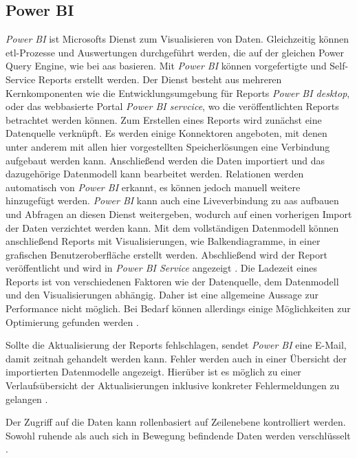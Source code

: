 \subsection{Power BI} \label{sec:grundlagen:azure_dienste:powerBI}
\textit{Power BI} ist Microsofts Dienst zum Visualisieren von Daten. Gleichzeitig können \ac{etl}-Prozesse und Auswertungen durchgeführt werden, die auf der gleichen Power Query Engine, wie bei \ac{aas} basieren. Mit \textit{Power BI} können vorgefertigte und Self-Service Reports erstellt werden. Der Dienst besteht aus mehreren Kernkomponenten wie die Entwicklungsumgebung für Reports \textit{Power BI desktop}, oder das webbasierte Portal \textit{Power BI servcice}, wo die veröffentlichten Reports betrachtet werden können. Zum Erstellen eines Reports wird zunächst eine Datenquelle verknüpft. Es werden einige Konnektoren angeboten, mit denen unter anderem mit allen hier vorgestellten Speicherlösungen eine Verbindung aufgebaut werden kann. Anschließend werden die Daten importiert und das dazugehörige Datenmodell kann bearbeitet werden. Relationen werden automatisch von \textit{Power BI} erkannt, es können jedoch manuell weitere hinzugefügt werden. \textit{Power BI} kann auch eine Liveverbindung zu \ac{aas} aufbauen und Abfragen an diesen Dienst weitergeben, wodurch auf einen vorherigen Import der Daten verzichtet werden kann. Mit dem vollständigen Datenmodell können anschließend Reports mit Visualisierungen, wie Balkendiagramme, in einer grafischen Benutzeroberfläche erstellt werden. Abschließend wird der Report veröffentlicht und wird in \textit{Power BI Service} angezeigt \cite{how_beyond_2020}. Die Ladezeit eines Reports ist von verschiedenen Faktoren wie der Datenquelle, dem Datenmodell und den Visualisierungen abhängig. Daher ist eine allgemeine Aussage zur Performance nicht möglich. Bei Bedarf können allerdings einige Möglichkeiten zur Optimierung gefunden werden \cite[vgl.][]{msdoc_21_pbi_optimization}.

Sollte die Aktualisierung der Reports fehlschlagen, sendet \textit{Power BI} eine E-Mail, damit zeitnah gehandelt werden kann. Fehler werden auch in einer Übersicht der importierten Datenmodelle angezeigt. Hierüber ist es möglich zu einer Verlaufsübersicht der Aktualisierungen inklusive konkreter Fehlermeldungen zu gelangen \cite{msdoc_21_pbi_dataRefresh}.

Der Zugriff auf die Daten kann rollenbasiert auf Zeilenebene kontrolliert werden. Sowohl ruhende als auch sich in Bewegung befindende Daten werden verschlüsselt \cite{msdoc_21_pbi_securityWhitePaper}.

